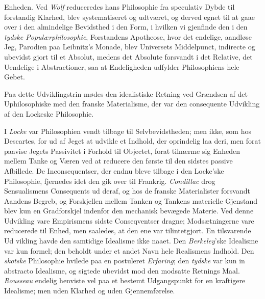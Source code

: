 \documentclass[12pt,a4paper]{book}
\newcommand{\opage}[1]{\marginnote{\footnotesize\textit{[#1]}}}
\begin{document}
Enheden. Ved \emph{Wolf} reduceredes hans Philosophie fra speculativ
Dybde til forstandig Klarhed, blev systematiseret og udtværet, og
derved egnet til at gaae over i den almindelige Bevidsthed i den Form,
i hvilken vi gjenfinde den i den \emph{tydske Populærphilosophie},
Forstandens Apotheose, hvor det endelige, aandløse Jeg, Parodien paa
Leibnitz's Monade, blev Universets Middelpunct, indirecte og ubevidst
gjort til et Absolut, medens det Absolute forsvandt i det Relative,
det Uendelige i Abstractioner, saa at Endeligheden udfylder
Philosophiens hele Gebet.

Paa dette Udviklingstrin mødes den idealistiske Retning ved Grændsen
af det Uphilosophiske med den franske Materialisme, der var den
consequente Udvikling af den Lockeske Philosophie.

I \emph{Locke} var Philosophien vendt tilbage til Selvbevidstheden;
men ikke, som hos Descartes, for ud af Jeget at udvikle et Indhold,
der oprindelig laa deri, men forat paavise Jegets Passivitet i Forhold
til Objectet, forat tilnærme sig Enheden mellem Tanke og Væren ved at
reducere den første til den sidstes passive Afbillede. De
Inconsequentser, der endnu bleve tilbage i den Locke'ske Philosophie,
fjernedes idet den gik over til Frankrig. \emph{Condillac} drog
Sensualismens Consequents ud deraf, og hos de franske Materialister
forsvandt Aandens Begreb, og Forskjellen mellem Tanken og Tankens
materielle Gjenstand blev kun en Gradforskjel indenfor den mechanisk
bevægede Materie. Ved denne Udvikling vare Empirismens sidste
Conseqventser dragne; Modsætningerne vare reducerede til Enhed, men
saaledes, at den ene var tilintetgjort. En tilsvarende Ud\-%
\opage{10}vikling havde den samtidige Idealisme ikke naaet. Den
\emph{Berkeley}'ske Idealisme var kun formel; den beholdt under et
andet Navn hele Realismens Indhold. Den \emph{skotske} Philosophie
hvilede paa en postuleret \emph{Erfaring}; den \emph{tydske} var kun
in abstracto Idealisme, og sigtede ubevidst mod den modsatte Retnings
Maal. \emph{Rousseau} endelig henviste vel paa et bestemt
Udgangspunkt for en kraftigere Idealisme; men uden Klarhed og uden
Gjennemførelse.
\end{document}
